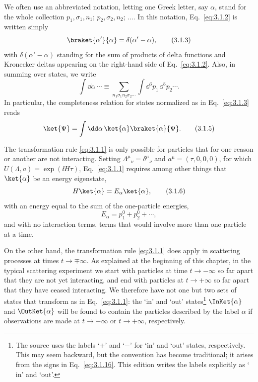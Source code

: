 We often use an abbreviated notation, letting one Greek letter, say $\alpha$,
stand for the whole collection
$p_1,\sigma_1,n_1;\,p_2,\sigma_2,n_2;\,\ldots$. In this notation,
Eq.~\eqref{eq:3.1.2} is written simply
\begin{equation}
\braket{\alpha'}{\alpha}=\delta(\alpha'-\alpha),
\tag{3.1.3}\label{eq:3.1.3}
\end{equation}
with $\delta(\alpha'-\alpha)$ standing for the sum of products of delta
functions and Kronecker deltas appearing on the right-hand side of
Eq.~\eqref{eq:3.1.2}. Also, in summing over states, we write
\begin{equation}
\int \dd\alpha\,\cdots\equiv
\sum_{n_1\sigma_1n_2\sigma_2\cdots}
\int \dd^3p_1\,\dd^3p_2\cdots.
\tag{3.1.4}\label{eq:3.1.4}
\end{equation}
In particular, the completeness relation for states normalized as in
Eq.~\eqref{eq:3.1.3} reads
\begin{equation}
\ket{\Psi}=\int \dd\alpha\,\ket{\alpha}\braket{\alpha}{\Psi}.
\tag{3.1.5}\label{eq:3.1.5}
\end{equation}

The transformation rule \eqref{eq:3.1.1} is only possible for particles that for one
reason or another are not interacting. Setting
$\Lambda^\mu{}_{\nu}=\delta^\mu{}_{\nu}$ and $a^\mu=(\tau,0,0,0)$, for
which $U(\Lambda,a)=\exp(\ii H\tau)$, Eq.~\eqref{eq:3.1.1} requires among other things
that $\ket{\alpha}$ be an energy eigenstate,
\begin{equation}
H\ket{\alpha}=E_\alpha\ket{\alpha},
\tag{3.1.6}\label{eq:3.1.6}
\end{equation}
with an energy equal to the sum of the one-particle energies,
\begin{equation}
E_\alpha=p_1^0+p_2^0+\cdots,
\tag{3.1.7}\label{eq:3.1.7}
\end{equation}
and with no interaction terms, terms that would involve more than one
particle at a time.

On the other hand, the transformation rule \eqref{eq:3.1.1} does apply in scattering
processes at times $t\to\mp\infty$. As explained at the beginning of this
chapter, in the typical scattering experiment we start with particles at time
$t\to-\infty$ so far apart that they are not yet interacting, and end with
particles at $t\to+\infty$ so far apart that they have ceased interacting. We
therefore have not one but two sets of states that transform as in
Eq.~\eqref{eq:3.1.1}: the `in' and `out' states\footnote{The source uses the
labels `$+$' and `$-$' for `in' and `out' states, respectively. This may seem
backward, but the convention has become traditional; it arises from the signs
in Eq.~\eqref{eq:3.1.16}. This edition writes the labels explicitly as
`$\mathrm{in}$' and `$\mathrm{out}$'.}
$\InKet{\alpha}$ and $\OutKet{\alpha}$
will be found to contain the particles described by the label $\alpha$ if
observations are made at $t\to-\infty$ or $t\to+\infty$,
respectively.

